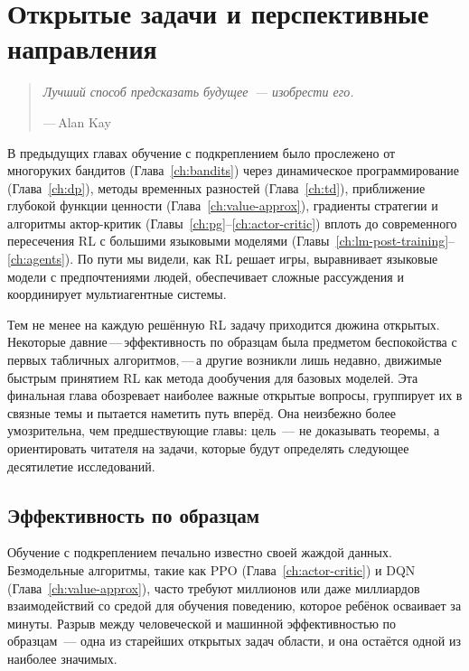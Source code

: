 
\chapter[Открытые задачи]{Открытые задачи и перспективные направления}
\label{ch:open}

\begin{quote}
\itshape
Лучший способ предсказать будущее~--- изобрести его.
\par\medskip
\upshape\raggedleft
---\,Alan Kay
\end{quote}

\bigskip

В предыдущих главах обучение с подкреплением было прослежено от
многоруких бандитов (Глава~\ref{ch:bandits}) через динамическое
программирование (Глава~\ref{ch:dp}), методы временных разностей
(Глава~\ref{ch:td}), приближение глубокой функции ценности
(Глава~\ref{ch:value-approx}), градиенты стратегии и алгоритмы актор-критик
(Главы~\ref{ch:pg}--\ref{ch:actor-critic}) вплоть до
современного пересечения RL с большими языковыми моделями
(Главы~\ref{ch:lm-post-training}--\ref{ch:agents}). По пути
мы видели, как RL решает игры, выравнивает языковые модели с предпочтениями людей,
обеспечивает сложные рассуждения и координирует мультиагентные системы.

Тем не менее на каждую решённую RL задачу приходится дюжина открытых. Некоторые
давние\,---\,эффективность по образцам была предметом беспокойства с
первых табличных алгоритмов,\,---\,а другие возникли лишь
недавно, движимые быстрым принятием RL как метода дообучения
для базовых моделей. Эта финальная глава обозревает наиболее
важные открытые вопросы, группирует их в связные темы и
пытается наметить путь вперёд. Она неизбежно более умозрительна,
чем предшествующие главы: цель~--- не доказывать теоремы,
а ориентировать читателя на задачи, которые будут определять следующее
десятилетие исследований.


\section{Эффективность по образцам}
\label{sec:open-sample}

Обучение с подкреплением печально известно своей жаждой данных. Безмодельные
алгоритмы, такие как PPO (Глава~\ref{ch:actor-critic})
и DQN (Глава~\ref{ch:value-approx}), часто требуют миллионов или
даже миллиардов взаимодействий со средой для обучения поведению, которое
ребёнок осваивает за минуты. Разрыв между человеческой и машинной
эффективностью по образцам~--- одна из старейших открытых задач области, и
она остаётся одной из наиболее значимых.

